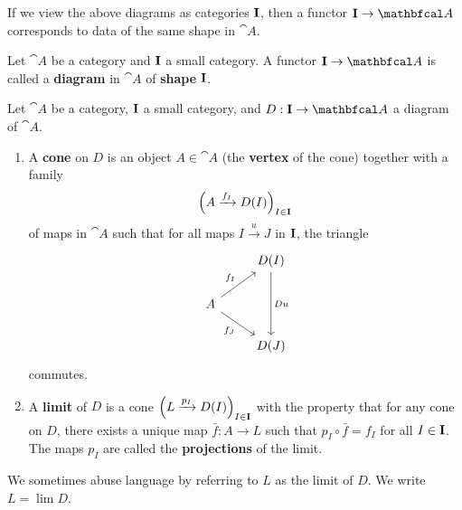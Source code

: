 If we view the above diagrams as categories $\mathbf{I}$, then a functor $\bcat{I}\to\cat{A}$ corresponds to data of the same shape in $\cat{A}$.

\begin{definition}
    Let $\cat{A}$ be a category and $\mathbf{I}$ a small category. A functor $\bcat{I}\to\cat{A}$ is called a \textbf{diagram} in $\cat{A}$ of \textbf{shape} $\mathbf{I}$.
\end{definition}

\begin{definition}
    Let $\cat{A}$ be a category, $\mathbf{I}$ a small category, and $D:\bcat{I}\to\cat{A}$ a diagram of $\cat{A}$.
    \begin{enumerate}[label=(\alph*)]
        \item A \textbf{cone} on $D$ is an object $A\in\cat{A}$ (the \textbf{vertex} of the cone) together with a family
            \begin{equation*}
                \Big( A\xrightarrow{f_I} D(I) \Big)_{I\in\mathbf{I}}
            \end{equation*}
            of maps in $\cat{A}$ such that for all maps $I\xrightarrow{u}J$ in $\mathbf{I}$, the triangle
            \begin{equation*}
            \begin{tikzcd}
                & D(I) \arrow[dd, "Du"] \\
                A \arrow[ur, "f_I"] \arrow[dr, "f_J"'] \\
                & D(J)
            \end{tikzcd}
            \end{equation*}
            commutes.
    \item A \textbf{limit} of $D$ is a cone $\Big( L\xrightarrow{p_I} D(I) \Big)_{I\in\mathbf{I}}$ with the property that for any cone on $D$, there exists a unique map $\bar{f}:A\to L$ such that $p_I\circ\bar{f}=f_I$ for all $I\in\mathbf{I}$. The maps $p_I$ are called the \textbf{projections} of the limit.
    \end{enumerate}
\end{definition}

\begin{remark}
    We sometimes abuse language by referring to $L$ as the limit of $D$. We write $L=\lim{D}$.
\end{remark}

